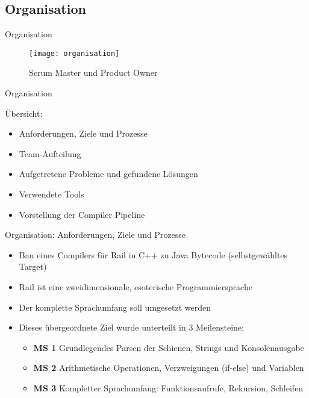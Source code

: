 \subsection{Organisation}

\begin{frame}{Organisation}

\begin{figure}
  \begin{center}
    \leavevmode
      \texttt{[image: organisation]}
    \caption{Scrum Master und Product Owner}
  \end{center}
\end{figure}

\end{frame}

\pagebreak

\begin{frame}{Organisation}

	\pause
	\"Ubersicht:
	\pause
	\begin{itemize}
		\item Anforderungen, Ziele und Prozesse
		\pause
		\item Team-Aufteilung 
		\pause
		\item Aufgetretene Probleme und gefundene L\"osungen
		\pause
		\item Verwendete Tools
		\pause
		\item Vorstellung der Compiler Pipeline
	\end{itemize}

\end{frame}

\pagebreak

\begin{frame}{Organisation: Anforderungen, Ziele und Prozesse}

	\pause
	\begin{itemize}
		\item Bau eines Compilers f\"ur Rail in C++ zu Java Bytecode (selbstgew\"ahltes Target)
		\pause
		\item Rail ist eine zweidimensionale, esoterische Programmiersprache 
		\pause
		\item Der komplette Sprachumfang soll umgesetzt werden
		\pause
		\item Dieses \"ubergeordnete Ziel wurde unterteilt in 3 Meilensteine:
		\pause
		\begin{itemize}
			\item \textbf{\textcolor{fu-blue}{MS 1}}  Grundlegendes Parsen der Schienen, Strings und Konsolenausgabe
			\pause
			\item \textbf{\textcolor{fu-blue}{MS 2}}  Arithmetische Operationen, Verzweigungen (if-else) und Variablen
			\pause
			\item \textbf{\textcolor{fu-blue}{MS 3}}  Kompletter Sprachumfang: Funktionsaufrufe, Rekursion, Schleifen 
		\end{itemize}
	\end{itemize}

\end{frame}
	
